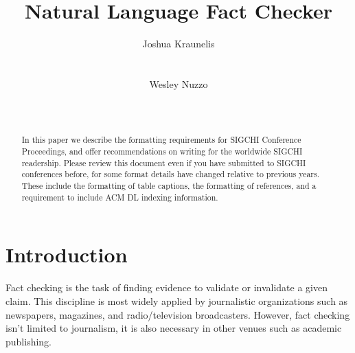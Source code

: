 \documentclass{chi2009}
\begin{document}
\setlength{\paperheight}{11in}
\setlength{\paperwidth}{8.5in}
\setlength{\pdfpageheight}{\paperheight}
\setlength{\pdfpagewidth}{\paperwidth}


\title{Natural Language Fact Checker}
\author{
  \alignauthor Joshua Kraunelis\\
    \\
    \\
  \alignauthor Wesley Nuzzo\\
    \\
    \\
}

\maketitle

\begin{abstract}
  In this paper we describe the formatting requirements for SIGCHI
  Conference Proceedings, and offer recommendations on writing for the
  worldwide SIGCHI readership.  Please review this document even if
  you have submitted to SIGCHI conferences before, for some format
  details have changed relative to previous years. These include the
  formatting of table captions, the formatting of references, and a
  requirement to include ACM DL indexing information.
\end{abstract}


\section{Introduction}

Fact checking is the task of finding evidence to validate or invalidate a given claim. This discipline is most widely applied by journalistic organizations such as newspapers, magazines, and radio/television broadcasters.  However, fact checking isn't limited to journalism, it is also necessary in other venues such as academic publishing.  
\end{document}
